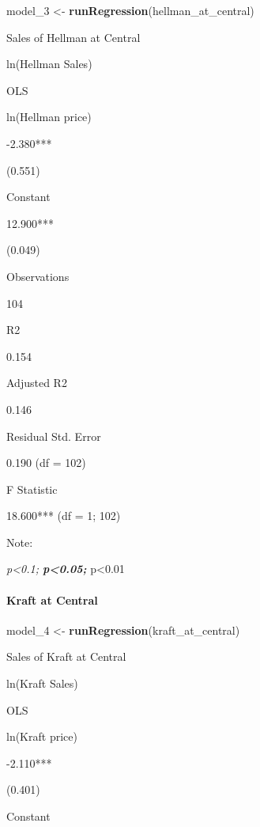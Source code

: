 \documentclass[]{article}
\newenvironment{Shaded}{\begin{snugshade}}{\end{snugshade}}
\newcommand{\DecValTok}[1]{\textcolor[rgb]{0.00,0.00,0.81}{#1}}
\newcommand{\KeywordTok}[1]{\textcolor[rgb]{0.13,0.29,0.53}{\textbf{#1}}}
\newcommand{\NormalTok}[1]{#1}
\newcommand{\StringTok}[1]{\textcolor[rgb]{0.31,0.60,0.02}{#1}}
\let\oldparagraph\paragraph
\renewcommand{\paragraph}[1]{\oldparagraph{#1}\mbox{}}
\begin{document}
\begin{Shaded}
\begin{Highlighting}[]
\NormalTok{model_}\DecValTok{3}\NormalTok{ <-}\StringTok{ }\KeywordTok{runRegression}\NormalTok{(hellman_at_central)}
\end{Highlighting}
\end{Shaded}

Sales of Hellman at Central

ln(Hellman Sales)

OLS

ln(Hellman price)

-2.380***

(0.551)

Constant

12.900***

(0.049)

Observations

104

R2

0.154

Adjusted R2

0.146

Residual Std. Error

0.190 (df = 102)

F Statistic

18.600*** (df = 1; 102)

Note:

\emph{p\textless{}0.1; \textbf{p\textless{}0.05; }}p\textless{}0.01

\hypertarget{kraft-at-central}{%
\paragraph{Kraft at Central}\label{kraft-at-central}}

\begin{Shaded}
\begin{Highlighting}[]
\NormalTok{model_}\DecValTok{4}\NormalTok{ <-}\StringTok{ }\KeywordTok{runRegression}\NormalTok{(kraft_at_central)}
\end{Highlighting}
\end{Shaded}

Sales of Kraft at Central

ln(Kraft Sales)

OLS

ln(Kraft price)

-2.110***

(0.401)

Constant
\end{document}
